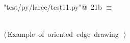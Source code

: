 \documentclass[11pt,oneside]{article}    %
\begin{document}
\begin{flushleft} \small \label{scrap35}
\protect{}\verb@"test/py/larcc/test11.py"@\nobreak\ {\footnotesize 21b }$\equiv$
\vspace{-1ex}
\begin{list}{}{} \item
\mbox{}\verb@@\\
\mbox{}\verb@@\hbox{$\langle\,$Example of oriented edge drawing\nobreak\ {\footnotesize {}}$\,\rangle$}\verb@@\\
\mbox{}\verb@@{\NWsep}
\end{list}
\vspace{-2ex}
\end{flushleft}
\end{document}
